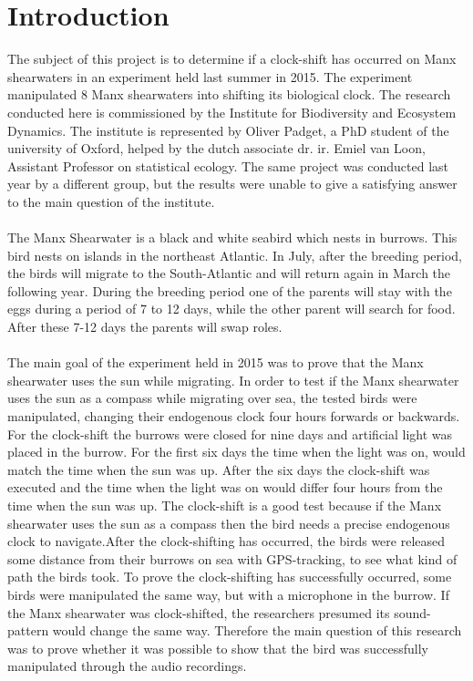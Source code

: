 \documentclass[a4paper]{article}
\begin{document}
\section*{Introduction}
The subject of this project is to determine if a clock-shift has occurred on Manx shearwaters in an experiment held last summer in 2015. The experiment manipulated 8 Manx shearwaters into shifting its biological clock. The research conducted here is commissioned by the Institute for Biodiversity and Ecosystem Dynamics. The institute is represented by Oliver Padget, a PhD student of the university of Oxford, helped by the dutch associate dr. ir. Emiel van Loon, Assistant Professor on statistical ecology. The same project was conducted last year by a different group, but the results were unable to give a satisfying answer to the main question of the institute.\\\\
 The Manx Shearwater is a black and white seabird which nests in burrows. This bird nests on islands in the northeast Atlantic. In July, after the breeding period, the birds will migrate to the South-Atlantic and will return again in March the following year. During the breeding period one of the parents will stay with the eggs during a period of 7 to 12 days, while the other parent will search for food. After these 7-12 days the parents will swap roles.\\\\ 
The main goal of the experiment held in 2015 was to prove that the Manx shearwater uses the sun while migrating. In order to test if the Manx shearwater uses the sun as a compass while migrating over sea, the tested birds were manipulated, changing their endogenous clock four hours forwards or backwards. For the clock-shift the burrows were closed for nine days and artificial light was placed in the burrow. For the first six days the time when the light was on, would match the time when the sun was up. After the six days the clock-shift was executed and the time when the light was on would differ four hours from the time when the sun was up. The clock-shift is a good test because if the Manx shearwater uses the sun as a compass then the bird needs a precise endogenous clock to navigate.After the clock-shifting has occurred, the birds were released some distance from their burrows on sea with GPS-tracking, to see what kind of path the birds took. To prove the clock-shifting has successfully occurred, some birds were manipulated the same way, but with a microphone in the burrow. If the Manx shearwater was clock-shifted, the researchers presumed its sound-pattern would change the same way. Therefore the main question of this research was to prove whether it was possible to show that the bird was successfully manipulated through the audio recordings.\\\\
\end{document}
